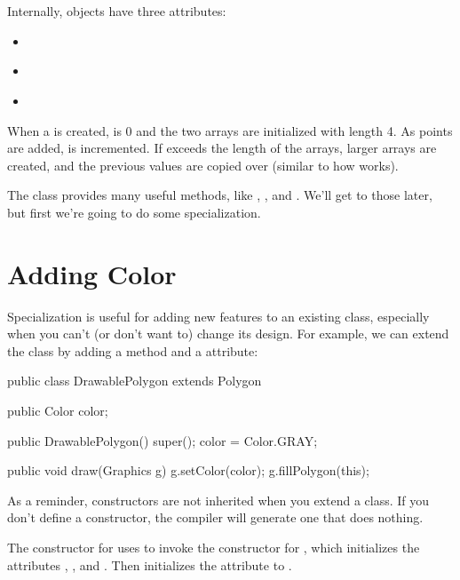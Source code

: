 Internally,  objects have three attributes:

\begin{itemize}

\item {} {\tt ~~~} 

\item {} {\tt ~} 

\item {} {\tt ~} 

\end{itemize}

When a  is created,  is 0 and the two arrays are initialized with length 4.
As points are added,  is incremented.
If  exceeds the length of the arrays, larger arrays are created, and the previous values are copied over (similar to how  works).

The  class provides many useful methods, like , , and .
We'll get to those later, but first we're going to do some specialization.


\section{Adding Color}

Specialization is useful for adding new features to an existing class, especially when you can't (or don't want to) change its design.
For example, we can extend the  class by adding a  method and a  attribute:

\begin{code}
public class DrawablePolygon extends Polygon {
    public Color color;

    public DrawablePolygon() {
        super();
        color = Color.GRAY;
    }

    public void draw(Graphics g) {
        g.setColor(color);
        g.fillPolygon(this);
    }
}
\end{code}

As a reminder, constructors are not inherited when you extend a class.
If you don't define a constructor, the compiler will generate one that does nothing.

The constructor for  uses  to invoke the constructor for , which initializes the attributes , , and .
Then  initializes the  attribute to .

